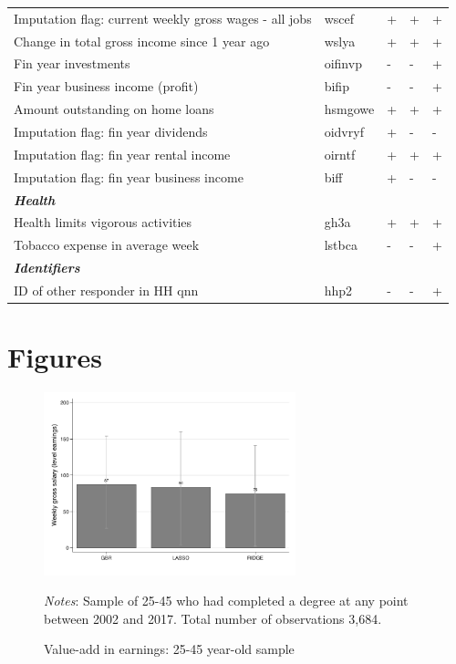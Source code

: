 \documentclass[12pt, a4paper]{article}
\begin{document}
\begin{longtable}{p{} C{0.1\textwidth} C{0.15\textwidth} C{0.15\textwidth} C{0.15\textwidth}}
Imputation flag: current weekly gross wages - all jobs 	& 	wscef	 & 	+	 & 	+	 & 	+	\\
Change in total gross income since 1 year ago 	& 	wslya	 & 	+	 & 	+	 & 	+	\\
Fin year investments 	& 	oifinvp	 & 	-	 & 	-	 & 	+	\\
Fin year business income (profit) 	& 	bifip	 & 	-	 & 	-	 & 	+	\\
Amount outstanding on home loans 	& 	hsmgowe	 & 	+	 & 	+	 & 	+	\\
Imputation flag: fin year dividends 	& 	oidvryf	 & 	+	 & 	-	 & 	-	\\
Imputation flag: fin year rental income 	& 	oirntf	 & 	+	 & 	+	 & 	+	\\
Imputation flag: fin year business income 	& 	biff	 & 	+	 & 	-	 & 	-	\\
\textbf{\textit{Health}} 	& 		 & 		 & 		 & 		\\
Health limits vigorous activities 	& 	gh3a	 & 	+	 & 	+	 & 	+	\\
Tobacco expense in average week 	& 	lstbca	 & 	-	 & 	-	 & 	+	\\
\textbf{\textit{Identifiers}} 	& 		 & 		 & 		 & 		\\
ID of other responder in HH qnn 	& 	hhp2	 & 	-	 & 	-	 & 	+	
\label{tab:mlvars}
\end{longtable}  
\normalsize
       
\section{Figures}
\label{app:figures}

\begin{figure}[H]
\centering
\caption{Value-add in earnings: 25-45 year-old sample}
\vspace{0.5cm}
  \label{fig:valadle46}
    \includegraphics[width=0.65\textwidth]{_figures/valad_levearn_46.pdf}
\parbox{1\textwidth}{\footnotesize{\textit{Notes}: Sample of 25-45 who had completed a degree at any point between 2002 and 2017. Total number of observations 3,684.}}
\end{figure}
\end{document}
